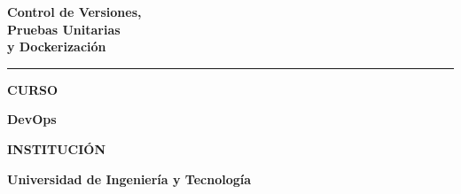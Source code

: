 \begin{titlepage}

\vspace*{6mm}

\vspace{13mm}



\vspace{25mm}

{\color{white}
    \sffamily
    \fontsize{25}{31}\selectfont
    \bfseries
    Control de Versiones,\\[2mm]
    Pruebas Unitarias\\[2mm]
    y Dockerización
}

\vspace{7mm}

\noindent
\textcolor{cyan!50!white}{\rule{38mm}{2pt}}

\vspace{13mm}



\begin{minipage}{0.82\textwidth}
    \sffamily

    {\color{cyan!30!white}
        \fontsize{8}{10}\selectfont
        \bfseries
        CURSO
    }\par

    \vspace{1mm}

    {\color{white}
        \fontsize{12}{15}\selectfont
        \bfseries
        DevOps
    }

    \vspace{6mm}

    {\color{cyan!30!white}
        \fontsize{8}{10}\selectfont
        \bfseries
        INSTITUCIÓN
    }\par

    \vspace{1mm}

    {\color{white}
        \fontsize{12}{15}\selectfont
        \bfseries
        Universidad de Ingeniería y Tecnología
    }

    \vspace{6mm}


\end{minipage}
\end{titlepage}
